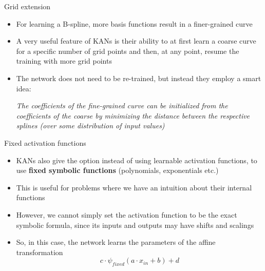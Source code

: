 \begin{frame}{Grid extension}
    \begin{itemize}
        \item For learning a B-spline, more basis functions result in a finer-grained curve \vspace{0.5em}
        \item A very useful feature of KANs is their ability to at first learn a coarse curve for a specific number of
        grid points and then, at any point, resume the training with more grid points \vspace{0.5em}
        \item The network does not need to be re-trained, but instead they employ a smart idea:\vspace{1em}

        \begin{center}
            \textit{The coefficients of the fine-grained curve can be initialized from the coefficients of the coarse by minimizing
            the distance between the respective splines (over some distribution of input values)}
        \end{center}
    \end{itemize}
\end{frame}

\begin{frame}{Fixed activation functions}
    \begin{itemize}
        \item KANs also give the option instead of using learnable activation functions, to use \textbf{fixed symbolic functions} (polynomials, exponentials etc.) \vspace{1em}
        \item This is useful for problems where we have an intuition about their internal functions \vspace{1em}
        \item However, we cannot simply set the activation function to be the exact symbolic formula, since its inputs and outputs may have shifts and scalings \vspace{1em}
        \item So, in this case, the network learns the parameters of the affine transformation $$c \cdot \psi_{fixed}(a \cdot x_{in} + b) + d$$
    \end{itemize}
\end{frame}

